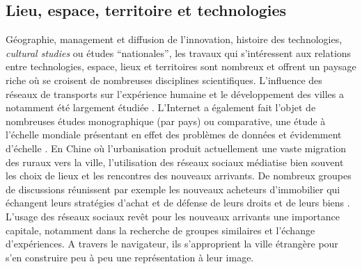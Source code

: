 \subsection[Lieu, espace, territoire et technologies]{Lieu, espace, territoire et technologies}
Géographie, management et diffusion de l’innovation, histoire des technologies, \textit{cultural studies} ou études “nationales”, les travaux qui s’intéressent aux relations entre technologies, espace, lieux et territoires sont nombreux et offrent un paysage riche où se croisent de nombreuses disciplines scientifiques. L’influence des réseaux de transports sur l’expérience humaine et le développement des villes a notamment été largement étudiée \citep{Offner1993,Doulet2001}. L’Internet a également fait l’objet de nombreuses études monographique (par pays) ou comparative, une étude à l’échelle mondiale présentant en effet des problèmes de données et évidemment d’échelle \citep{Dupuy2004}. En Chine où l'urbanisation produit actuellement une vaste migration des ruraux vers la ville, l'utilisation des réseaux sociaux médiatise bien souvent les choix de lieux et les rencontres des nouveaux arrivants. De nombreux groupes de discussions réunissent par exemple les nouveaux acheteurs d’immobilier qui échangent leurs stratégies d’achat et de défense de leurs droits et de leurs biens \citep{Li2013}. L’usage des réseaux sociaux revêt pour les nouveaux arrivants une importance capitale, notamment dans la recherche de groupes similaires et l’échange d’expériences. A travers le navigateur, ils s'approprient la ville étrangère pour s'en construire peu à peu une représentation à leur image.

